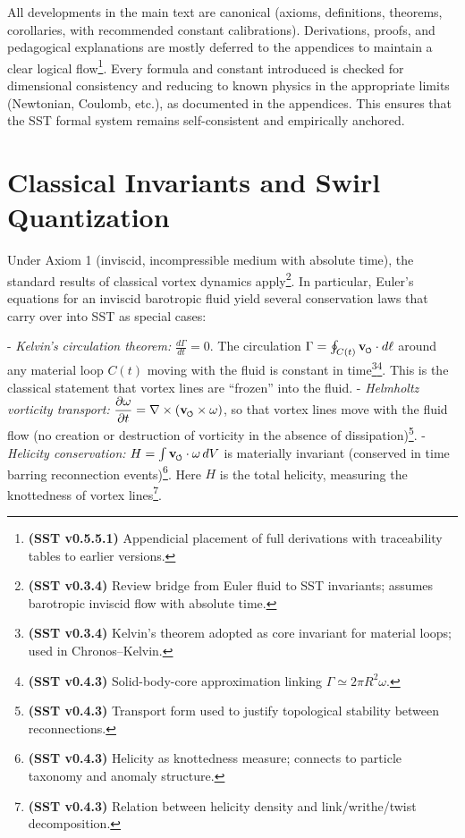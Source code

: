 \documentclass[reprint,aps,onecolumn,nofootinbib]{revtex4-2}
\newcommand{\swirlarrow}{%
    \mathchoice{\mkern-2mu\scriptstyle\boldsymbol{\circlearrowleft}}%
    {\mkern-2mu\scriptstyle\boldsymbol{\circlearrowleft}}%
    {\mkern-2mu\scriptscriptstyle\boldsymbol{\circlearrowleft}}%
    {\mkern-2mu\scriptscriptstyle\boldsymbol{\circlearrowleft}}%
}
\newcommand{\vswirl}{\mathbf{v}_{\swirlarrow}}
\begin{document}
    All developments in the main text are canonical (axioms, definitions, theorems, corollaries, with recommended constant calibrations). Derivations, proofs, and pedagogical explanations are mostly deferred to the appendices to maintain a clear logical flow\footnote{\textbf{(SST v0.5.5.1)} Appendicial placement of full derivations with traceability tables to earlier versions.}. Every formula and constant introduced is checked for dimensional consistency and reducing to known physics in the appropriate limits (Newtonian, Coulomb, etc.), as documented in the appendices. This ensures that the SST formal system remains self-consistent and empirically anchored.


\section{Classical Invariants and Swirl Quantization}
    Under Axiom 1 (inviscid, incompressible medium with absolute time), the standard results of classical vortex dynamics apply\footnote{\textbf{(SST v0.3.4)} Review bridge from Euler fluid to SST invariants; assumes barotropic inviscid flow with absolute time.}. In particular, Euler’s equations for an inviscid barotropic fluid yield several conservation laws that carry over into SST as special cases:

    - \emph{Kelvin’s circulation theorem:} $\displaystyle \frac{d\Gamma}{dt} = 0$. The circulation $\Gamma = \oint_{C(t)} \vswirl \cdot d\ell$ around any material loop $C(t)$ moving with the fluid is constant in time\footnote{\textbf{(SST v0.3.4)} Kelvin’s theorem adopted as core invariant for material loops; used in Chronos–Kelvin.}\footnote{\textbf{(SST v0.4.3)} Solid-body-core approximation linking $\Gamma \simeq 2\pi R^2\omega$.}. This is the classical statement that vortex lines are “frozen” into the fluid.
    - \emph{Helmholtz vorticity transport:} $\displaystyle \frac{\partial \omega}{\partial t} = \nabla \times (\vswirl \times \omega)$, so that vortex lines move with the fluid flow (no creation or destruction of vorticity in the absence of dissipation)\footnote{\textbf{(SST v0.4.3)} Transport form used to justify topological stability between reconnections.}.
    - \emph{Helicity conservation:} $H = \int \vswirl \cdot \omega\, dV$ is materially invariant (conserved in time barring reconnection events)\footnote{\textbf{(SST v0.4.3)} Helicity as knottedness measure; connects to particle taxonomy and anomaly structure.}. Here $H$ is the total helicity, measuring the knottedness of vortex lines\footnote{\textbf{(SST v0.4.3)} Relation between helicity density and link/writhe/twist decomposition.}.
\end{document}
